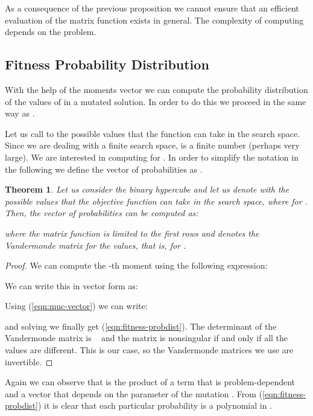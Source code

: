 \documentclass{article}
\newtheorem{theorem}{Theorem}
\begin{document}
As a consequence of the previous proposition we cannot ensure that an efficient evaluation of the matrix function  exists in general. The complexity of computing   depends on the problem.






\subsection{Fitness Probability Distribution}
\label{subsec:fitness-prob-distr}

With the help of the moments vector  we can compute the probability distribution of the values of  in a mutated solution. In order to do this we proceed in the same way as \cite{Sutton2011foga}. 

Let us call  to the  possible values that the function  can take in the search space. Since we are dealing with a finite search space,  is a finite number (perhaps very large). We are interested in computing  for . In order to simplify the notation in the following we define the vector of probabilities  as .

\begin{theorem}
Let us consider the binary hypercube and let us denote with  the possible values that the objective function  can take in the search space, where  for . Then, the vector of probabilities  can be computed as:

where the matrix function  is limited to the first  rows and  denotes the Vandermonde matrix for the  values, that is,  for .
\end{theorem}
\begin{proof}
We can compute the -th moment  using the following expression: 

We can write this in vector form as:

Using (\ref{eqn:muc-vector}) we can write:

and solving  we finally get (\ref{eqn:fitness-probdist}). The determinant of the Vandermonde matrix is ~\citep[pp. 17-18]{Mirsky1955} and the matrix is nonsingular if and only if all the  values are different. This is our case, so the Vandermonde matrices we use are invertible.
\end{proof}

Again we can observe that  is the product of a term that is problem-dependent and a vector that depends on the parameter of the mutation . From (\ref{eqn:fitness-probdist}) it is clear that each particular probability  is a polynomial in .
\end{document}
